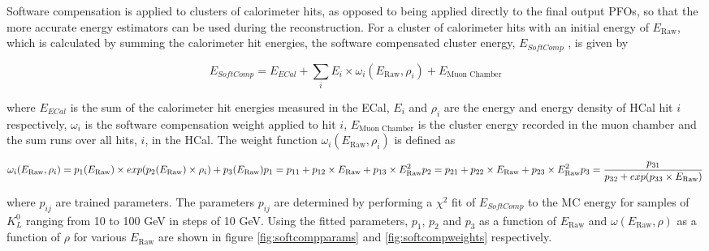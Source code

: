 Software compensation is applied to clusters of calorimeter hits, as opposed to being applied directly to the final output PFOs, so that the more accurate energy estimators can be used during the reconstruction.  For a cluster of calorimeter hits with an initial energy of $E_{\text{Raw}}$, which is  calculated by summing the calorimeter hit energies, the software compensated cluster energy, $E_{SoftComp}$ \cite{Adloff:2012gv}, is given by 

\begin{equation}
E_{SoftComp} = E_{ECal} + \sum_{i} E_{i} \times \omega_{i}(E_{\text{Raw}}, \rho_{i}) + E_{\text{Muon Chamber}}
\label{equ:softcomp}
\end{equation}

where $E_{ECal}$ is the sum of the calorimeter hit energies measured in the ECal, $E_{i}$ and $\rho_{i}$ are the energy and energy density of HCal hit $i$ respectively, $\omega_{i}$ is the software compensation weight applied to hit $i$, $E_{\text{Muon Chamber}}$ is the cluster energy recorded in the muon chamber and the sum runs over all hits, $i$, in the HCal.  The weight function $\omega_{i}(E_{\text{Raw}}, \rho_{i})$ is defined as

\begin{equation}
\omega_{i}(E_{\text{Raw}}, \rho_{i}) = p_{1}(E_{\text{Raw}}) \times exp(p_{2}(E_{\text{Raw}}) \times \rho_{i}) + p_{3}(E_{\text{Raw}}) \\
p_{1} = p_{11} + p_{12} \times E_{\text{Raw}} + p_{13} \times E_{\text{Raw}}^{2} \\
p_{2} = p_{21} + p_{22} \times E_{\text{Raw}} + p_{23} \times E_{\text{Raw}}^{2} \\
p_{3} = \frac{p_{31}}{p_{32} + exp(p_{33} \times E_{\text{Raw}})}
\label{equ:softcompweight}
\end{equation}

where $p_{ij}$ are trained parameters.  The parameters $p_{ij}$ are determined by performing a $\chi^{2}$ fit of $E_{SoftComp}$ to the MC energy for samples of $K^{0}_{L}$ ranging from 10 to 100 GeV in steps of 10 GeV.  Using the fitted parameters, $p_{1}$,  $p_{2}$ and $p_{3}$ as a function of $E_{\text{Raw}}$ and $\omega(E_{\text{Raw}}, \rho)$ as a function of $\rho$ for various $E_{\text{Raw}}$ are shown in figure \ref{fig:softcompparams} and \ref{fig:softcompweights} respectively.  

